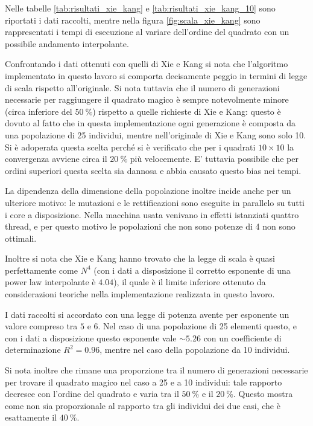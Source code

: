 \documentclass[italian,twoside,twocolumn]{article}
\begin{document}
Nelle tabelle \ref{tab:risultati_xie_kang} e \ref{tab:risultati_xie_kang_10}  sono riportati i dati raccolti, mentre nella figura \ref{fig:scala_xie_kang} sono rappresentati i tempi di esecuzione al variare dell'ordine del quadrato con un possibile andamento interpolante. 

Confrontando i dati ottenuti con quelli di Xie e Kang si nota che l'algoritmo implementato in questo lavoro si comporta decisamente peggio in termini di legge di scala rispetto all'originale. Si nota tuttavia che il numero di generazioni necessarie per raggiungere il quadrato magico è sempre notevolmente minore (circa inferiore del $ \SI{50}{\percent} $) rispetto a quelle richieste di Xie e Kang: questo è dovuto al fatto che in questa implementazione ogni generazione è composta da una popolazione di 25 individui, mentre nell'originale di Xie e Kang sono solo 10. Si è adoperata questa scelta perché si è verificato che per i quadrati $ 10\times 10 $ la convergenza avviene circa il $ \SI{20}{\percent} $ più velocemente. E' tuttavia possibile che per ordini superiori questa scelta sia dannosa e abbia causato questo bias nei tempi.

La dipendenza della dimensione della popolazione inoltre incide anche per un ulteriore motivo: le mutazioni e le rettificazioni sono eseguite in parallelo su tutti i core a disposizione. Nella macchina usata venivano in effetti istanziati quattro thread, e per questo motivo le popolazioni che non sono potenze di 4 non sono ottimali.

Inoltre si nota che Xie e Kang hanno trovato che la legge di scala è quasi perfettamente come $ N^4 $ (con i dati a disposizione il corretto esponente di una power law interpolante è $ \num{4.04} $), il quale è il limite inferiore ottenuto da considerazioni teoriche nella implementazione realizzata in questo lavoro.

I dati raccolti si accordato con una legge di potenza avente per esponente un valore compreso tra $ 5 $ e $ 6 $. Nel caso di una popolazione di 25 elementi questo, e con i dati a disposizione questo esponente vale $ \sim \num{5.26} $ con un coefficiente di determinazione $ R^2 = \num{0.96} $, mentre nel caso della popolazione da 10 individui. 

Si nota inoltre che rimane una proporzione tra il numero di generazioni necessarie per trovare il quadrato magico nel caso a 25 e a 10 individui: tale rapporto decresce con l'ordine del quadrato e varia tra il $ \SI{50}{\percent} $ e il $ \SI{20}{\percent} $. Questo mostra come non sia proporzionale al rapporto tra gli individui dei due casi, che è esattamente il $ \SI{40}{\percent} $.
\end{document}
